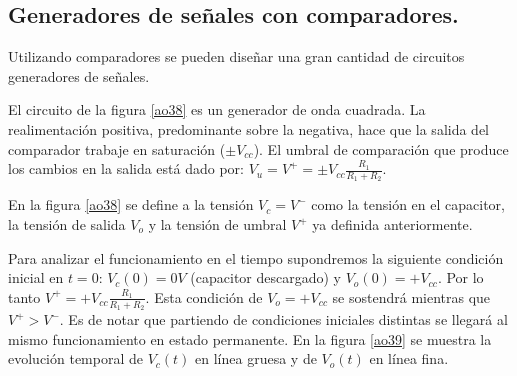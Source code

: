\subsection{Generadores de señales con comparadores.}

\hspace{10pt} Utilizando comparadores se pueden diseñar una gran cantidad de
circuitos generadores de señales.

El circuito de la figura \ref{ao38} es un generador de onda
cuadrada. La realimentación positiva, predominante sobre la
negativa, hace que la salida del comparador trabaje en saturación
($\pm V_{cc}$). El umbral de comparación que produce los cambios en
la salida está dado por: $V_u=V^+=\pm V_{cc} \frac{\displaystyle
	R_1}{\displaystyle R_1+R_2}$.

En la figura \ref{ao38} se define a la tensión  $V_c=V^-$ como la
tensión en el capacitor, la tensión de salida $V_o$ y la tensión de
umbral $V^+$ ya definida anteriormente.

Para analizar el funcionamiento en el tiempo supondremos la
siguiente condición inicial en $t=0$: $V_c(0)=0V$ (capacitor
descargado) y $V_o(0)=+V_{cc}$. Por lo tanto
$V^+=+V_{cc}\frac{\displaystyle R_1}{\displaystyle R_1+R_2}$. Esta
condición de $V_o=+V_{cc}$ se sostendrá mientras que $V^+ > V^-$. Es
de notar que partiendo de condiciones iniciales distintas se llegará
al mismo funcionamiento en estado permanente. En la figura
\ref{ao39} se muestra la evolución temporal de $V_c(t)$ en línea
gruesa y de $V_o(t)$ en línea fina.

